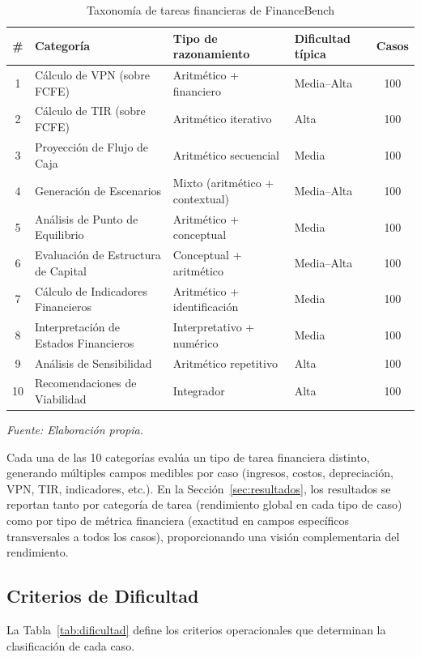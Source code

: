 \documentclass[12pt,a4paper]{article}
\begin{document}
\begin{table}[H]
\centering
\caption{Taxonomía de tareas financieras de FinanceBench}
\label{tab:taxonomia}
\begin{tabularx}{\textwidth}{clXXc}
\toprule
\textbf{\#} & \textbf{Categoría} & \textbf{Tipo de razonamiento} & \textbf{Dificultad típica} & \textbf{Casos} \\
\midrule
1 & Cálculo de VPN (sobre FCFE) & Aritmético + financiero & Media--Alta & 100 \\
2 & Cálculo de TIR (sobre FCFE) & Aritmético iterativo & Alta & 100 \\
3 & Proyección de Flujo de Caja & Aritmético secuencial & Media & 100 \\
4 & Generación de Escenarios & Mixto (aritmético + contextual) & Media--Alta & 100 \\
5 & Análisis de Punto de Equilibrio & Aritmético + conceptual & Media & 100 \\
6 & Evaluación de Estructura de Capital & Conceptual + aritmético & Media--Alta & 100 \\
7 & Cálculo de Indicadores Financieros & Aritmético + identificación & Media & 100 \\
8 & Interpretación de Estados Financieros & Interpretativo + numérico & Media & 100 \\
9 & Análisis de Sensibilidad & Aritmético repetitivo & Alta & 100 \\
10 & Recomendaciones de Viabilidad & Integrador & Alta & 100 \\
\bottomrule
\end{tabularx}
\smallskip
\footnotesize\textit{Fuente: Elaboración propia.}
\end{table}

Cada una de las 10 categorías evalúa un tipo de tarea financiera distinto, generando múltiples campos medibles por caso (ingresos, costos, depreciación, VPN, TIR, indicadores, etc.). En la Sección~\ref{sec:resultados}, los resultados se reportan tanto por categoría de tarea (rendimiento global en cada tipo de caso) como por tipo de métrica financiera (exactitud en campos específicos transversales a todos los casos), proporcionando una visión complementaria del rendimiento.

\subsection{Criterios de Dificultad}

La Tabla~\ref{tab:dificultad} define los criterios operacionales que determinan la clasificación de cada caso.
\end{document}
